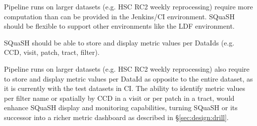 Pipeline runs on larger datasets (e.g. HSC RC2 weekly reprocessing) require more computation than can be provided in the Jenkins/CI environment. SQuaSH should be flexible to support other environments like the LDF environment.

\begin{recommendation}
SQuaSH should be able to store and display metric values per DataIds (e.g. CCD, visit, patch, tract, filter).
\end{recommendation}

Pipeline runs on larger datasets (e.g. HSC RC2 weekly reprocessing) also require to store and display metric values per DataId as opposite to the entire dataset, as it is currently with the test datasets in CI. The ability to identify metric values per filter name or spatially by CCD in a visit or per patch in a tract, would enhance SQuaSH display and monitoring capabilities, turning SQuaSH or its successor into a richer metric dashboard as described in \S\ref{sec:design:drill}.
